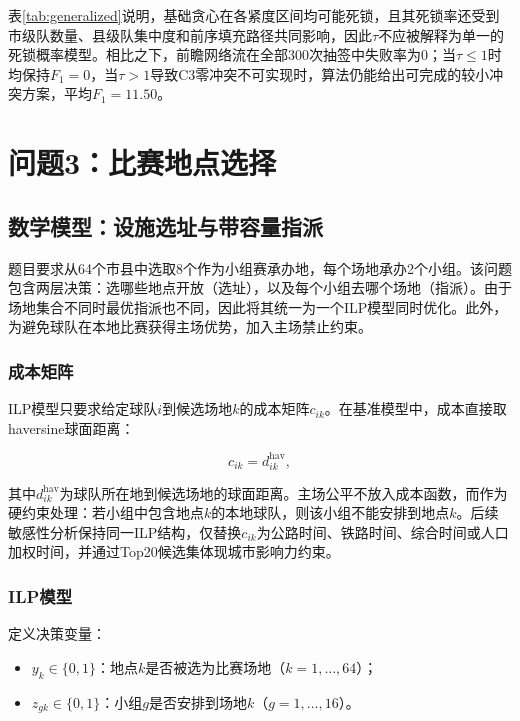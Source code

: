 \documentclass[12pt,a4paper]{article}
\begin{document}
表\ref{tab:generalized}说明，基础贪心在各紧度区间均可能死锁，且其死锁率还受到市级队数量、县级队集中度和前序填充路径共同影响，因此$\tau$不应被解释为单一的死锁概率模型。相比之下，前瞻网络流在全部300次抽签中失败率为0；当$\tau\le1$时均保持$F_1=0$，当$\tau>1$导致C3零冲突不可实现时，算法仍能给出可完成的较小冲突方案，平均$F_1=11.50$。
\section{问题3：比赛地点选择}

\subsection{数学模型：设施选址与带容量指派}

题目要求从64个市县中选取8个作为小组赛承办地，每个场地承办2个小组。该问题包含两层决策：选哪些地点开放（选址），以及每个小组去哪个场地（指派）。由于场地集合不同时最优指派也不同，因此将其统一为一个ILP模型同时优化。此外，为避免球队在本地比赛获得主场优势，加入主场禁止约束。

\subsubsection{成本矩阵}

ILP模型只要求给定球队$i$到候选场地$k$的成本矩阵$c_{ik}$。在基准模型中，成本直接取haversine球面距离：

\begin{equation}
  c_{ik}=d_{ik}^{\mathrm{hav}},
  \label{eq:cost}
\end{equation}

其中$d_{ik}^{\mathrm{hav}}$为球队所在地到候选场地的球面距离。主场公平不放入成本函数，而作为硬约束处理：若小组中包含地点$k$的本地球队，则该小组不能安排到地点$k$。后续敏感性分析保持同一ILP结构，仅替换$c_{ik}$为公路时间、铁路时间、综合时间或人口加权时间，并通过Top20候选集体现城市影响力约束。

\subsubsection{ILP模型}

定义决策变量：
\begin{itemize}
  \item $y_k \in \{0,1\}$：地点$k$是否被选为比赛场地（$k = 1,\dots,64$）；
  \item $z_{gk} \in \{0,1\}$：小组$g$是否安排到场地$k$（$g = 1,\dots,16$）。
\end{itemize}
\end{document}
